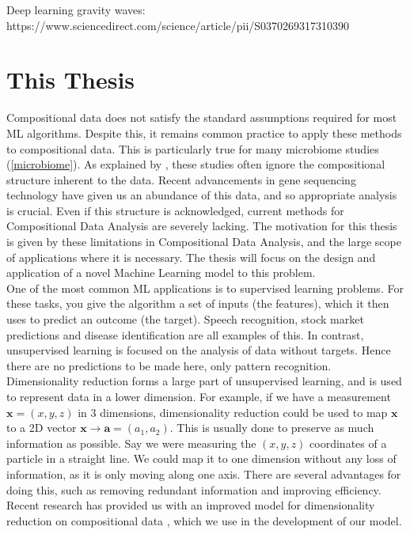 Deep learning gravity waves:
https://www.sciencedirect.com/science/article/pii/S0370269317310390

\section{This Thesis}
\label{sec:thisthesis}
Compositional data does not satisfy the standard assumptions required for most ML algorithms. Despite this, it remains common practice to apply these methods to compositional data. This is particularly true for many microbiome studies (\ref{microbiome}). As explained by \cite{Gloor2017}, these studies often ignore the compositional structure inherent to the data. Recent advancements in gene sequencing technology have given us an abundance of this data, and so appropriate analysis is crucial. Even if this structure is acknowledged, current methods for Compositional Data Analysis are severely lacking.  The motivation for this thesis is given by these limitations in Compositional Data Analysis, and the large scope of applications where it is necessary. The thesis will focus on the design and application of a novel Machine Learning model to this problem.\\ 

One of the most common ML applications is to supervised learning problems. For these tasks, you give the algorithm a set of inputs (the features), which it then uses to predict an outcome (the target). Speech recognition, stock market predictions and disease identification are all examples of this. In contrast, unsupervised learning is focused on the analysis of data without targets. Hence there are no predictions to be made here, only pattern recognition.  Dimensionality reduction forms a large part of unsupervised learning, and is used to represent data in a lower dimension. For example, if we have a measurement $\mathbf{x} = (x,y,z)$ in 3 dimensions, dimensionality reduction could be used to map $\mathbf{x}$ to a 2D vector $\mathbf{x} \to \mathbf{a} = (a_1,a_2)$. This is usually done to preserve as much information as possible. Say we were measuring the $(x,y,z)$ coordinates of a particle in a straight line. We could map it to one dimension without any loss of information, as it is only moving along one axis. There are several advantages for doing this, such as removing redundant information and improving efficiency. Recent research has provided us with an improved model for dimensionality reduction on compositional data \citep{Avalos2018}, which we use in the development of our model. \\  

